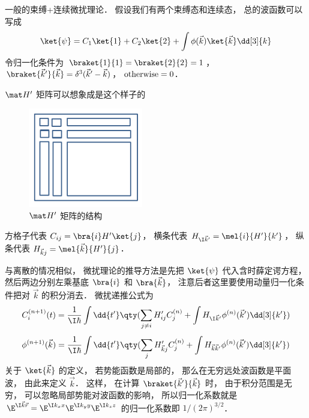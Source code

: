 

一般的束缚+连续微扰理论． 假设我们有两个束缚态和连续态， 总的波函数可以写成
 \begin{equation}
\ket{\psi} = C_1\ket{1} + C_2\ket{2} + \int \phi (\vec k)\ket{\vec k} \dd[3]{k}
\end{equation}
令归一化条件为 $\braket{1}{1} = \braket{2}{2} = 1$，  $\braket{\vec k'}{\vec k}  = \delta ^3 (\vec k' - \vec k)$，  $\rm{otherwise} = 0$． 

 $\mat H'$  矩阵可以想象成是这个样子的
\begin{figure}[ht]
\centering
\includegraphics[width=5cm]{./figures/PTCont.pdf}
\caption{$\mat H'$ 矩阵的结构} 
\end{figure}

方格子代表 $C_{ij} = \bra{i} H' \ket{j}$， 横条代表 $H_{\I\vec k'} = \mel{i}{H'}{k'}$，  纵条代表 $H_{\vec k j} = \mel{\vec k}{H'}{j}$． 

与离散的情况相似， 微扰理论的推导方法是先把 $\ket{\psi}$ 代入含时薛定谔方程， 然后两边分别左乘基底 $\bra{i}$ 和 $\bra{\vec k}$，  注意后者这里要使用动量归一化条件把对 $\vec k$ 的积分消去． 微扰递推公式为
 \begin{equation}
C_i^{(n + 1)}(t) = \frac{1}{\I\hbar} \int \dd{t'} \qty(\sum_{j \ne i} H'_{ij} C_j^{(n)} + \int H_{\I\vec k'} \phi ^{(n)} (\vec k') \dd[3]{k'} )
\end{equation}
\begin{equation}
\phi^{(n+1)}(\vec k) = \frac{1}{\I\hbar} \int \dd{t'} \qty(\sum_j H'_{\vec kj} C_j^{(n)} + \int H_{\vec k\vec k'} \phi ^{(n)}(\vec k') \dd[3]{k'})
\end{equation}
关于 $\ket{\vec k}$  的定义， 若势能函数是局部的， 那么在无穷远处波函数是平面波， 由此来定义 $\vec k$．  这样， 在计算 $\braket{\vec k'}{\vec k}$ 时， 由于积分范围是无穷， 可以忽略局部势能对波函数的影响， 所以归一化系数就是 $\E^{\I \vec k\vec r} = \E^{\I k_x x} \E^{\I k_y y} \E^{\I k_z z}$ 的归一化系数即 $1/{(2\pi )^{3/2}}$． 
 
